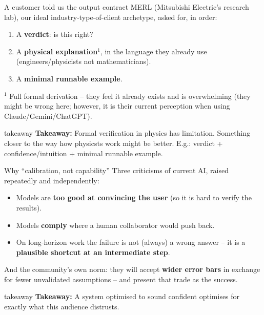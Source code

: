 \documentclass[aspectratio=169,11pt]{beamer}
\newcommand{\takeaway}[1]{%
  \vfill
  \begin{beamercolorbox}[wd=\textwidth,sep=0.45em]{takeaway}
    \small\textbf{Takeaway:} #1
  \end{beamercolorbox}%
}
\newcommand{\lead}[1]{\textcolor{fpaccent}{\textbf{#1}}}
\begin{document}
\begin{frame}{A customer told us the output contract}
  MERL (Mitsubishi Electric's research lab), our ideal industry-type-of-client archetype, asked for, in order:
  \vspace{0.6em}
  \begin{enumerate}\setlength\itemsep{0.5em}
    \item A \lead{verdict}: is this right?
    \item A \lead{physical explanation}$^1$, in the language they already use (engineers/physicists not mathematicians).
    \item A \lead{minimal runnable example}.
  \end{enumerate}
  \vspace{0.6em}
  {\footnotesize $^1$ Full formal derivation -- they feel it already exists and is overwhelming (they might be wrong here; however, it is their current perception when using Claude/Gemini/ChatGPT).}
  \takeaway{Formal verification in physics has limitation. Something closer to the way how physicsts work might be better. E.g.: verdict + confidence/intuition + minimal runnable example.}
\end{frame}

\begin{frame}{Why ``calibration, not capability''}
  Three criticisms of current AI, raised repeatedly and independently:
  \begin{itemize}\setlength\itemsep{0.55em}
    \item Models are \textbf{too good at convincing the user} (so it is hard to verify the results).
    \item Models \textbf{comply} where a human collaborator would push back.
    \item On long-horizon work the failure is not (always) a wrong answer -- it is a \textbf{plausible shortcut at an intermediate step}.
  \end{itemize}
  \vspace{0.4em}
  And the community's own norm: they will accept \textbf{wider error bars} in exchange for fewer unvalidated assumptions -- and present that trade as the success.
  \takeaway{A system optimised to sound confident optimises for exactly what this audience distrusts.}
\end{frame}
\end{document}
